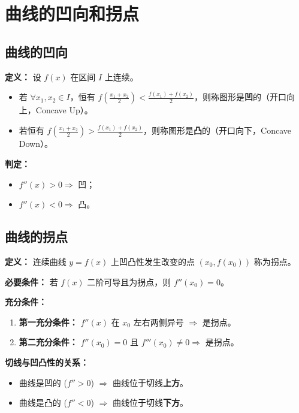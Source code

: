 \documentclass[a4paper,12pt]{ctexart}
\newenvironment{purplebox}
  {\begin{tcolorbox}[colback=white, colframe=boxpurple, boxrule=1pt, sharp corners, title=\textbf{定义/定理/核心公式}]}
  {\end{tcolorbox}}
\newenvironment{rednote}
  {\begin{tcolorbox}[colback=notepurple, colframe=highlightred, boxrule=1pt, title=\textbf{重点/技巧/手写笔记}]}
  {\end{tcolorbox}}
\begin{document}
\section{曲线的凹向和拐点}

\subsection{曲线的凹向}
\begin{purplebox}
    \textbf{定义：} 设 $f(x)$ 在区间 $I$ 上连续。
    \begin{itemize}
        \item 若 $\forall x_1, x_2 \in I$，恒有 $f\left(\frac{x_1+x_2}{2}\right) < \frac{f(x_1)+f(x_2)}{2}$，则称图形是\textbf{凹}的（开口向上，Concave Up）。
        \item 若恒有 $f\left(\frac{x_1+x_2}{2}\right) > \frac{f(x_1)+f(x_2)}{2}$，则称图形是\textbf{凸}的（开口向下，Concave Down）。
    \end{itemize}
    \textbf{判定：} 
    \begin{itemize}
        \item $f''(x) > 0 \Rightarrow$ 凹；
        \item $f''(x) < 0 \Rightarrow$ 凸。
    \end{itemize}
\end{purplebox}

\subsection{曲线的拐点}
\textbf{定义：} 连续曲线 $y=f(x)$ 上凹凸性发生改变的点 $(x_0, f(x_0))$ 称为拐点。

\textbf{必要条件：} 若 $f(x)$ 二阶可导且为拐点，则 $f''(x_0) = 0$。

\textbf{充分条件：}
\begin{enumerate}
    \item \textbf{第一充分条件：} $f''(x)$ 在 $x_0$ 左右两侧异号 $\Rightarrow$ 是拐点。
    \item \textbf{第二充分条件：} $f''(x_0) = 0$ 且 $f'''(x_0) \neq 0 \Rightarrow$ 是拐点。
\end{enumerate}

\begin{rednote}
    \textbf{切线与凹凸性的关系：}
    \begin{itemize}
        \item 曲线是凹的 ($f'' > 0$) $\Rightarrow$ 曲线位于切线\textbf{上方}。
        \item 曲线是凸的 ($f'' < 0$) $\Rightarrow$ 曲线位于切线\textbf{下方}。
    \end{itemize}
\end{rednote}
\end{document}
